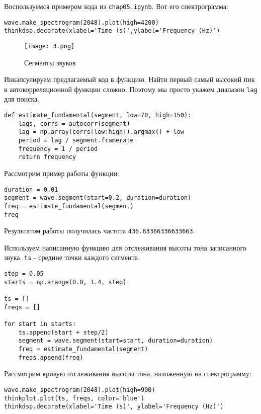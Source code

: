 \documentclass[a4paper,12pt]{report}
\begin{document}
Воспользуемся примером кода из \texttt{chap05.ipynb}. Вот его спектрограмма:

\begin{lstlisting}[caption=Спектрограмма звука]
wave.make_spectrogram(2048).plot(high=4200)
thinkdsp.decorate(xlabel='Time (s)',ylabel='Frequency (Hz)')
\end{lstlisting}

\begin{figure}[H]
        \centering
        \texttt{[image: 3.png]}
        \caption{Сегменты звуков}
        \label{fig:lab5_fig2_1}
\end{figure}

Инкапсулируем предлагаемый код в функцию. Найти первый самый высокий пик в автокорреляционной функции сложно. Поэтому мы просто укажем диапазон \texttt{lag} для поиска.

\begin{lstlisting}[caption=Инкапсуляция функции]
def estimate_fundamental(segment, low=70, high=150):
    lags, corrs = autocorr(segment)
    lag = np.array(corrs[low:high]).argmax() + low
    period = lag / segment.framerate
    frequency = 1 / period
    return frequency
\end{lstlisting}

Рассмотрим пример работы функции:

\begin{lstlisting}[caption=Пример работы функции]
duration = 0.01
segment = wave.segment(start=0.2, duration=duration)
freq = estimate_fundamental(segment)
freq
\end{lstlisting}

Результатом работы получилась частота \texttt{436.63366336633663}.

Используем написанную функцию для отслеживания высоты тона записанного звука. \texttt{ts} - средние точки каждого сегмента.

\begin{lstlisting}[caption=Отслеживание высоты тона]
step = 0.05
starts = np.arange(0.0, 1.4, step)

ts = []
freqs = []

for start in starts:
    ts.append(start + step/2)
    segment = wave.segment(start=start, duration=duration)
    freq = estimate_fundamental(segment)
    freqs.append(freq)
\end{lstlisting}

Рассмотрим кривую отслеживания высоты тона, наложенную на спектрограмму:

\begin{lstlisting}[caption=Кривая отслеживания высоты тона на спектрограмме]
wave.make_spectrogram(2048).plot(high=900)
thinkplot.plot(ts, freqs, color='blue')
thinkdsp.decorate(xlabel='Time (s)', ylabel='Frequency (Hz)')
\end{lstlisting}
\end{document}
